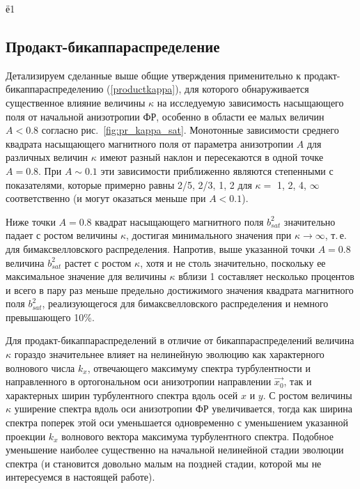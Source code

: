 ё1



\subsection{Продакт-бикаппа{\PunctumKappa}распределение}

Детализируем сделанные выше общие утверждения применительно к продакт- бикаппа{\PunctumKappa}распределению (\ref{productkappa}), для которого обнаруживается существенное влияние величины $\kappa$ на исследуемую зависимость насыщающего поля от начальной анизотропии ФР, особенно в области ее малых величин $A<0.8$ согласно рис.~\ref{fig:pr_kappa_sat}. Монотонные зависимости среднего квадрата насыщающего магнитного поля от параметра анизотропии $A$ для различных величин $\kappa$ имеют разный наклон и пересекаются в одной точке $A=0.8$. При $A \sim 0.1$ эти зависимости приближенно являются степенными с показателями, которые примерно равны 2/5, 2/3, 1, 2 для $\kappa =$ 1, 2, 4, $\infty$ соответственно (и могут оказаться меньше при $A < 0.1$).  

Ниже точки $A=0.8$ квадрат насыщающего магнитного поля $b_{sat}^2$ значительно падает с ростом величины $\kappa$, достигая минимального значения при $\kappa \rightarrow \infty$, т.\,е. для бимаксвелловского распределения. Напротив, выше указанной точки $A=0.8$ величина $b_{sat}^2$ растет с ростом $\kappa$, хотя и не столь значительно, поскольку ее максимальное значение для величины $\kappa$ вблизи 1 составляет несколько процентов и всего в пару раз меньше предельно достижимого значения квадрата магнитного поля $b_{sat}^2$, реализующегося для бимаксвелловского распределения и немного превышающего 10\%. 

Для продакт-бикаппа{\PunctumKappa}распределений в отличие от бикаппа{\PunctumKappa}распределений величина $\kappa$ гораздо значительнее влияет на нелинейную эволюцию как характерного волнового числа $k_x$, отвечающего максимуму спектра турбулентности и направленного в ортогональном оси анизотропии направлении $\vec{x_0}$, так и характерных ширин турбулентного спектра вдоль осей $x$ и $y$. С ростом величины $\kappa$ уширение спектра вдоль оси анизотропии ФР увеличивается, тогда как ширина спектра поперек этой оси уменьшается одновременно с уменьшением указанной проекции $k_x$ волнового вектора максимума турбулентного спектра. Подобное уменьшение наиболее существенно на начальной нелинейной стадии эволюции спектра (и становится довольно малым на поздней стадии, которой мы не интересуемся в настоящей работе).

